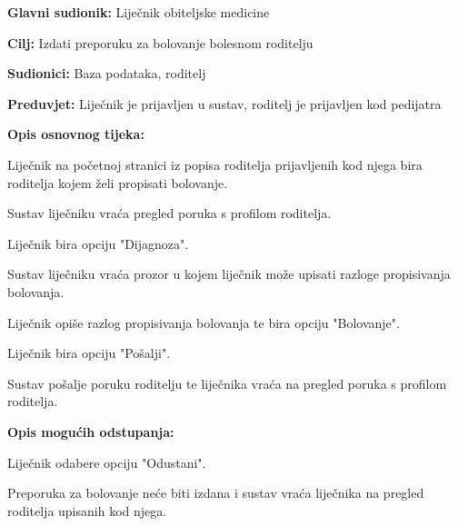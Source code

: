 					
					\noindent {}
					\begin{packed_item}
						
						\item \textbf{Glavni sudionik: }Liječnik obiteljske medicine
						\item  \textbf{Cilj:} Izdati preporuku za bolovanje bolesnom roditelju
						\item  \textbf{Sudionici:} Baza podataka, roditelj
						\item  \textbf{Preduvjet:} Liječnik je prijavljen u sustav, roditelj je prijavljen kod pedijatra
						\item  \textbf{Opis osnovnog tijeka:}
						
						\item[] \begin{packed_enum}
							
							\item Liječnik na početnoj stranici iz popisa roditelja prijavljenih kod njega bira roditelja kojem želi propisati bolovanje.
							\item Sustav liječniku vraća pregled poruka s profilom roditelja.
							\item Liječnik bira opciju "Dijagnoza".
							\item Sustav liječniku vraća prozor u kojem liječnik može upisati razloge propisivanja bolovanja.
							\item Liječnik opiše razlog propisivanja bolovanja te bira opciju "Bolovanje".
							\item Liječnik bira opciju "Pošalji".
							\item Sustav pošalje poruku roditelju te liječnika vraća na pregled poruka s profilom roditelja.
						\end{packed_enum}
						
						\item  \textbf{Opis mogućih odstupanja:}
						
						\item[] \begin{packed_item}
							
							\item[6.a] Liječnik odabere opciju "Odustani".
							\item[] \begin{packed_enum}
								
								\item Preporuka za bolovanje neće biti izdana i sustav vraća liječnika na pregled roditelja upisanih kod njega.
							\end{packed_enum}
							
							
						\end{packed_item}
						
						
					\end{packed_item}
					
